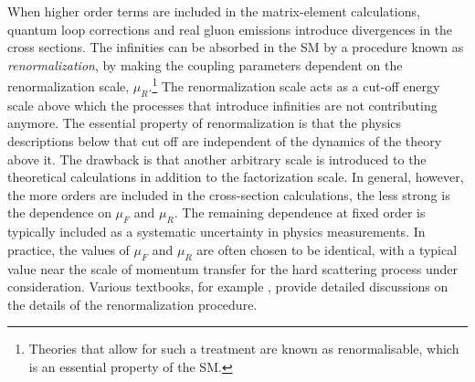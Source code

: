 When higher order terms are included in the matrix-element calculations, quantum loop corrections and real gluon emissions introduce divergences in the cross sections. 
The infinities can be absorbed in the SM by a procedure known as \emph{renormalization}, by making the coupling parameters dependent on the renormalization scale, $\mu_R$.\footnote{Theories that allow for such a treatment are known as renormalisable, which is an essential property of the SM.}
The renormalization scale acts as a cut-off energy scale above which the processes that introduce infinities are not contributing anymore. 
The essential property of renormalization is that the physics descriptions below that cut off are independent of the dynamics of the theory above it. 
The drawback is that another arbitrary scale is introduced to the theoretical calculations in addition to the factorization scale.
In general, however, the more orders are included in the cross-section calculations, the less strong is the dependence on $\mu_F$ and $\mu_R$. 
The remaining dependence at fixed order is typically included as a systematic uncertainty in physics measurements.
In practice, the values of $\mu_F$ and $\mu_R$ are often chosen to be identical, with a typical value near the scale of momentum transfer for the hard scattering process under consideration.
Various textbooks, for example , provide detailed discussions on the details of the renormalization procedure.

